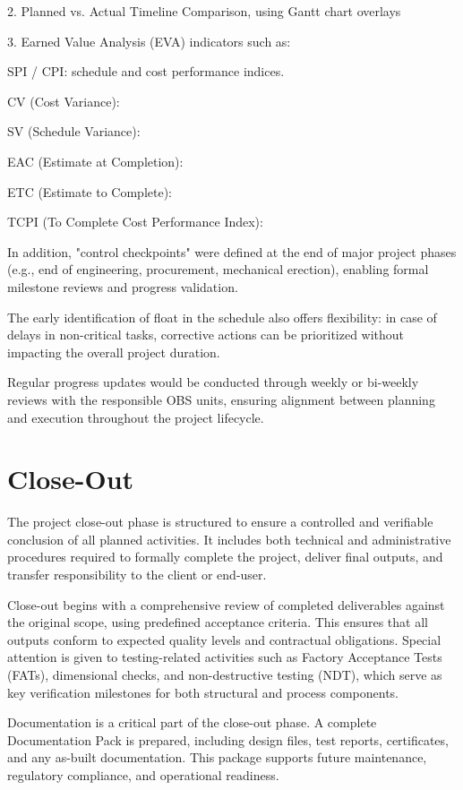 2.   Planned vs. Actual Timeline Comparison, using Gantt chart overlays

3.   Earned Value Analysis (EVA) indicators such as:

SPI / CPI: schedule and cost performance indices.

CV (Cost Variance):

SV (Schedule Variance):

EAC (Estimate at Completion):

ETC (Estimate to Complete):

TCPI (To Complete Cost Performance Index):

In addition, "control checkpoints" were defined at the end of major project phases (e.g., end of engineering, procurement, mechanical erection), enabling formal milestone reviews and progress validation.

The early identification of float in the schedule also offers flexibility: in case of delays in non-critical tasks, corrective actions can be prioritized without impacting the overall project duration.

Regular progress updates would be conducted through weekly or bi-weekly reviews with the responsible OBS units, ensuring alignment between planning and execution throughout the project lifecycle.

\section{Close-Out}

The project close-out phase is structured to ensure a controlled and verifiable conclusion of all planned activities. It includes both technical and administrative procedures required to formally complete the project, deliver final outputs, and transfer responsibility to the client or end-user.

Close-out begins with a comprehensive review of completed deliverables against the original scope, using predefined acceptance criteria. This ensures that all outputs conform to expected quality levels and contractual obligations. Special attention is given to testing-related activities such as Factory Acceptance Tests (FATs), dimensional checks, and non-destructive testing (NDT), which serve as key verification milestones for both structural and process components.

Documentation is a critical part of the close-out phase. A complete Documentation Pack is prepared, including design files, test reports, certificates, and any as-built documentation. This package supports future maintenance, regulatory compliance, and operational readiness.

